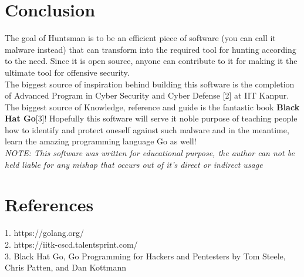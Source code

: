 \documentclass[12pt]{article}
\begin{document}
\section{Conclusion}
The goal of Huntsman is to be an efficient piece of software (you can call it malware instead) that can transform into the required tool for hunting according to the need. Since it is open source, anyone can contribute to it for making it the ultimate tool for offensive security. \\
The biggest source of inspiration behind building this software is the completion of Advanced Program in Cyber Security  and Cyber Defense [2] at IIT Kanpur. The biggest source of Knowledge, reference and guide is the fantastic book \textbf{Black Hat Go}[3]! Hopefully this software will serve it noble purpose of teaching people how to identify and protect oneself against such malware and in the meantime, learn the amazing programming language Go as well!\\
\textit{NOTE: This software was written for educational purpose, the author can not be held liable for any mishap that occurs out of it's direct or indirect usage}


\section{References}
1. https://golang.org/ \\
2. https://iitk-cscd.talentsprint.com/ \\
3. Black Hat Go, Go Programming for Hackers and Pentesters by Tom Steele, Chris Patten, and Dan Kottmann \\
\end{document}
